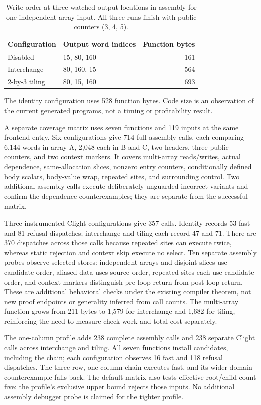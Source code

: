\begin{table}[t]
\centering
\caption{Write order at three watched output locations in assembly for one
independent-array input. All three runs finish with public counters (3, 4, 5).}
\label{tab:nested-order}
\begin{tabular}{llr}
\toprule
Configuration & Output word indices & Function bytes \\
\midrule
Disabled & 15, 80, 160 & 161 \\
Interchange & 80, 160, 15 & 564 \\
2-by-3 tiling & 80, 15, 160 & 693 \\
\bottomrule
\end{tabular}
\end{table}
The identity configuration uses 528 function bytes. Code size is an observation
of the current generated programs, not a timing or profitability result.

A separate coverage matrix uses seven functions and 119 inputs at the same
frontend entry. Six configurations give 714 full assembly calls, each comparing
6,144 words in array A, 2,048 each in B and C, two headers, three public counters,
and two context markers. It covers multi-array reads/writes, actual dependence,
same-allocation slices, nonzero entry counters, conditionally defined body
scalars, body-value wrap, repeated sites, and surrounding control. Two additional
assembly calls execute deliberately unguarded incorrect variants and confirm the
dependence counterexamples; they are separate from the successful matrix.

Three instrumented Clight configurations give 357 calls. Identity records
53 fast and 81 refusal dispatches; interchange and tiling each record 47 and 71.
There are 370 dispatches across those calls because repeated sites can execute
twice, whereas static rejection and context skip execute no select. Ten separate
assembly probes observe selected stores: independent arrays and disjoint slices
use candidate order, aliased data uses source order, repeated sites each use
candidate order, and context markers distinguish pre-loop return from post-loop
return. These are additional behavioral checks under the existing compiler
theorem, not new proof endpoints or generality inferred from call counts.
The multi-array function grows from 211 bytes to 1,579 for interchange and 1,682
for tiling, reinforcing the need to measure check work and total cost separately.

The one-column profile adds 238 complete assembly calls and 238 separate Clight
calls across interchange and tiling. All seven functions install candidates,
including the chain; each configuration observes 16 fast and 118 refusal
dispatches. The three-row, one-column chain executes fast, and its wider-domain
counterexample falls back. The default matrix also tests effective root/child
count five: the profile's exclusive upper bound rejects those inputs. No
additional assembly debugger probe is claimed for the tighter profile.

